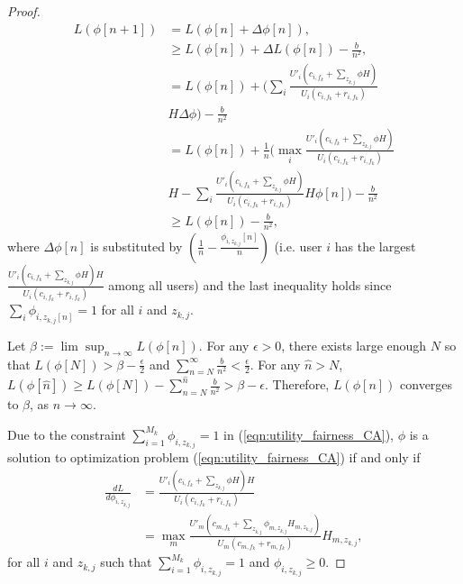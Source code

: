 \documentclass[conference]{IEEEtran}
\begin{document}
\begin{proof}
\vspace{-1em}
\begin{equation}\label{eqn:L_inequality}
\begin{aligned}
L(\phi[n+1]) & = L(\phi[n]+\Delta\phi[n]),\\
& \geq L(\phi[n])+\Delta
L(\phi[n])-\frac{b}{n^2},\\
&=L(\phi[n])
+\Big(\sum_i \frac{U'_i(c_{i,f_k}+\sum_{z_{k,j}}\phi H)}{U_i(c_{i,f_k}+r_{i,f_k})}\\
&H \Delta\phi \Big) -\frac{b}{n^2} \\
&=L(\phi[n])
+\frac{1}{n}\Big(\max_i\frac{U'_i(c_{i,f_k}+\sum_{z_{k,j}}\phi H)}{U_i(c_{i,f_k}+r_{i,f_k})}\\
&H -\sum_i\frac{U'_i(c_{i,f_k}+\sum_{z_{k,j}}\phi H)}{U_i(c_{i,f_k}+r_{i,f_k})}
H \phi[n]\Big)-\frac{b}{n^2}\\
&\geq L(\phi[n])-\frac{b}{n^2},
\end{aligned}
\end{equation}
where $\Delta\phi[n]$ is substituted by $(\frac{1}{n}-\frac{\phi_{i,z_{k,j}}[n]}{n})$ (i.e. user $i$ has the largest $\frac{U'_i(c_{i,f_k}+\sum_{z_{k,j}}\phi H)H}{U_i(c_{i,f_k}+r_{i,f_k})}$ among all users) and the last inequality holds since $\sum_i\phi_{i,z_{k,j}[n]}=1$ for all $i$ and $z_{k,j}$.

Let $\beta := \lim \sup_{n \rightarrow \infty} L(\phi[n])$. For any $\epsilon > 0$, there exists large enough $N$ so that $L(\phi[N])>\beta-\frac{\epsilon}{2}$ and $\sum_{n=N}^{\infty}\frac{b}{n^2}<\frac{\epsilon}{2}$. For any $\hat{n}>N$, $L(\phi[\hat{n}]) \geq L(\phi[N])-\sum_{n=N}^{\hat{n}}\frac{b}{n^2} > \beta-\epsilon$. Therefore, $L(\phi[n])$ converges to $\beta$, as $n \rightarrow \infty$.

Due to the constraint $\sum_{i=1}^{M_k} \phi_{i,z_{k,j}} = 1$ in (\ref{eqn:utility_fairness_CA}), $\phi$ is a solution to optimization problem (\ref{eqn:utility_fairness_CA}) if and only if
\vspace{-0.5em}
\begin{equation}\label{eqn:opt_Maximization}
\begin{aligned}
\frac{dL}{d\phi_{i,z_{k,j}}}  &=\frac{U'_i(c_{i,f_k}+\sum_{z_{k,j}}\phi H)H}{U_i(c_{i,f_k}+r_{i,f_k})} \\
&=\max_m \frac{U'_m(c_{m,f_k}+\sum_{z_{k,j}}\phi_{m,z_{k,j}}H_{m,z_{k,j}})}{U_m(c_{m,f_k}+r_{m,f_k})}
H_{m,z_{k,j}},
\end{aligned}
\end{equation}
for all $i$ and $z_{k,j}$ such that $\sum_{i=1}^{M_k}\phi_{i,z_{k,j}}=1$ and $\phi_{i,z_{k,j}} \geq 0$.
\end{proof}
\end{document}
